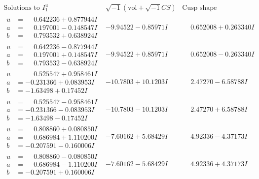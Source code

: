 \documentclass[1p]{elsarticle_modified}
\theoremstyle{definition}
\newcommand{\I}{\sqrt{-1}}
\begin{document}
$$\begin{array}{c|c|c}  
\text{Solutions to }I^u_{1}& \I (\text{vol} + \sqrt{-1}CS) & \text{Cusp shape}\\
 \hline 
\begin{aligned}
u &= \phantom{-}0.642236 + 0.877944 I \\
a &= \phantom{-}0.197001 - 0.148547 I \\
b &= \phantom{-}0.793532 + 0.638924 I\end{aligned}
 & -9.94522 - 0.85971 I & \phantom{-}0.652008 + 0.263340 I \\ \hline\begin{aligned}
u &= \phantom{-}0.642236 - 0.877944 I \\
a &= \phantom{-}0.197001 + 0.148547 I \\
b &= \phantom{-}0.793532 - 0.638924 I\end{aligned}
 & -9.94522 + 0.85971 I & \phantom{-}0.652008 - 0.263340 I \\ \hline\begin{aligned}
u &= \phantom{-}0.525547 + 0.958461 I \\
a &= -0.231366 + 0.083953 I \\
b &= -1.63498 + 0.17452 I\end{aligned}
 & -10.7803 + 10.1203 I & \phantom{-}2.47270 - 6.58788 I \\ \hline\begin{aligned}
u &= \phantom{-}0.525547 - 0.958461 I \\
a &= -0.231366 - 0.083953 I \\
b &= -1.63498 - 0.17452 I\end{aligned}
 & -10.7803 - 10.1203 I & \phantom{-}2.47270 + 6.58788 I \\ \hline\begin{aligned}
u &= \phantom{-}0.808860 + 0.080850 I \\
a &= \phantom{-}0.686984 + 1.110200 I \\
b &= -0.207591 - 0.160006 I\end{aligned}
 & -7.60162 + 5.68429 I & \phantom{-}4.92336 - 4.37173 I \\ \hline\begin{aligned}
u &= \phantom{-}0.808860 - 0.080850 I \\
a &= \phantom{-}0.686984 - 1.110200 I \\
b &= -0.207591 + 0.160006 I\end{aligned}
 & -7.60162 - 5.68429 I & \phantom{-}4.92336 + 4.37173 I \\ \hline\begin{aligned}

\end{aligned}
\end{array}$$
\end{document}
